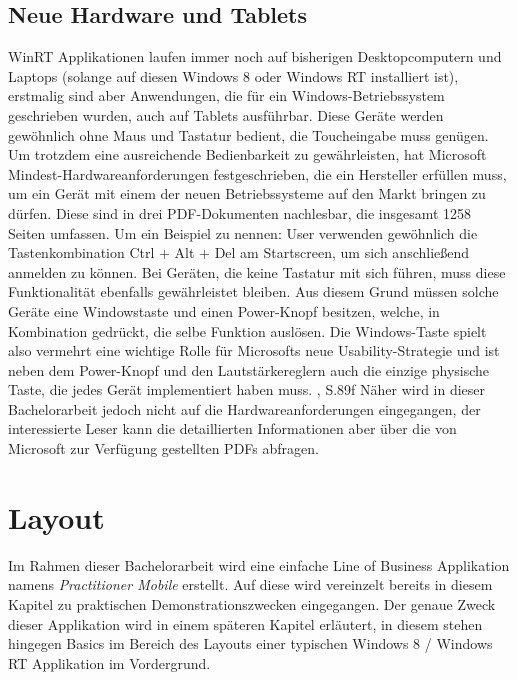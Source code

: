 \documentclass[a4paper,bibtotoc,oneside]{scrbook}
\begin{document}
\section[Neue Hardware und Tablets]{Neue Hardware und Tablets}
WinRT Applikationen laufen immer noch auf bisherigen Desktopcomputern und Laptops (solange auf diesen Windows 8 oder Windows RT installiert ist), erstmalig sind aber Anwendungen, die für ein Windows-Betriebssystem geschrieben wurden, auch auf Tablets ausführbar.
\newline
Diese Geräte werden gewöhnlich ohne Maus und Tastatur bedient, die Toucheingabe muss genügen. Um trotzdem eine ausreichende Bedienbarkeit zu gewährleisten, hat Microsoft Mindest-Hardwareanforderungen festgeschrieben, die ein Hersteller erfüllen muss, um ein Gerät mit einem der neuen Betriebssysteme auf den Markt bringen zu dürfen.
\newline
Diese sind in drei PDF-Dokumenten nachlesbar, die insgesamt 1258 Seiten umfassen. Um ein Beispiel zu nennen: User verwenden gewöhnlich die Tastenkombination Ctrl + Alt + Del am Startscreen, um sich anschließend anmelden zu können. Bei Geräten, die keine Tastatur mit sich führen, muss diese Funktionalität ebenfalls gewährleistet bleiben. Aus diesem Grund müssen solche Geräte eine Windowstaste und einen Power-Knopf besitzen, welche, in Kombination gedrückt, die selbe Funktion auslösen.
\newline
\newline
Die Windows-Taste spielt also vermehrt eine wichtige Rolle für Microsofts neue Usability-Strategie und ist neben dem Power-Knopf und den Lautstärkereglern auch die einzige physische Taste, die jedes Gerät implementiert haben muss. \cite{hw12}, S.89f
\newline
\newline
Näher wird in dieser Bachelorarbeit jedoch nicht auf die Hardwareanforderungen eingegangen, der interessierte Leser kann die detaillierten Informationen aber über die von Microsoft zur Verfügung gestellten PDFs abfragen.


\chapter[Layout]{Layout}
Im Rahmen dieser Bachelorarbeit wird eine einfache Line of Business Applikation namens \textit{Practitioner Mobile} erstellt. Auf diese wird vereinzelt bereits in diesem Kapitel zu praktischen Demonstrationszwecken eingegangen. Der genaue Zweck dieser Applikation wird in einem späteren Kapitel erläutert, in diesem stehen hingegen Basics im Bereich des Layouts einer typischen Windows 8 / Windows RT Applikation im Vordergrund.
\end{document}
